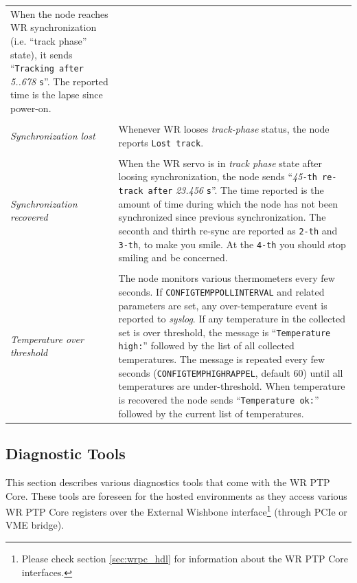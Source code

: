 \documentclass[a4paper, 12pt]{article}
\renewcommand{\_}{\underscore\allowbreak}
\begin{document}
\begin{sloppypar}
\begin{longtable}{  p{6.5cm}  p{9cm} }
	When the node reaches WR synchronization (i.e. ``track phase''
        state), it sends ``\texttt{Tracking after} \textit{5..678} \texttt{s}''.
        The reported time is the lapse since power-on.\\
& \\
\textit{ Synchronization lost } &

	Whenever WR looses \textit{track-phase} status, the node reports
        \texttt{Lost track}.\\
& \\
\textit{ Synchronization recovered } &

	When the WR servo is in \textit{track phase} state after loosing
        synchronization, the node sends ``\textit{45}\texttt{-th re-track after}
        \textit{23.456} \texttt{s}''. The time reported is the amount of time
        during which the node has not been synchronized since previous synchronization.
        The seconth and
        thirth re-sync are reported as \texttt{2-th} and \texttt{3-th}, to make you
        smile. At the \texttt{4-th} you should stop smiling and be concerned.\\
& \\
\textit{ Temperature over threshold } &

	The node monitors various thermometers every few seconds.
        If \texttt{CONFIG\_TEMP\_POLL\_INTERVAL} and related parameters are
        set, any over-temperature event is reported to \textit{syslog}.
        If any temperature in the collected set is over threshold,
        the message is ``\texttt{Temperature high:}'' followed by the list of
        all collected temperatures.  The message is repeated every
        few seconds (\texttt{CONFIG\_TEMP\_HIGH\_RAPPEL}, default 60)
        until all temperatures are under-threshold. When temperature
        is recovered the node sends ``\texttt{Temperature ok:}'' followed by
        the current list of temperatures.\\
\end{longtable}
\end{sloppypar}


\newpage
\subsection{Diagnostic Tools}
\label{Diagnostic Tools}
This section describes various diagnostics tools that come with the WR PTP Core.
These tools are foreseen for the hosted environments as they access various WR
PTP Core registers over the External Wishbone interface\footnote{Please check
section \ref{sec:wrpc_hdl} for information about the WR PTP Core interfaces.}
(through PCIe or VME bridge).
\end{document}
